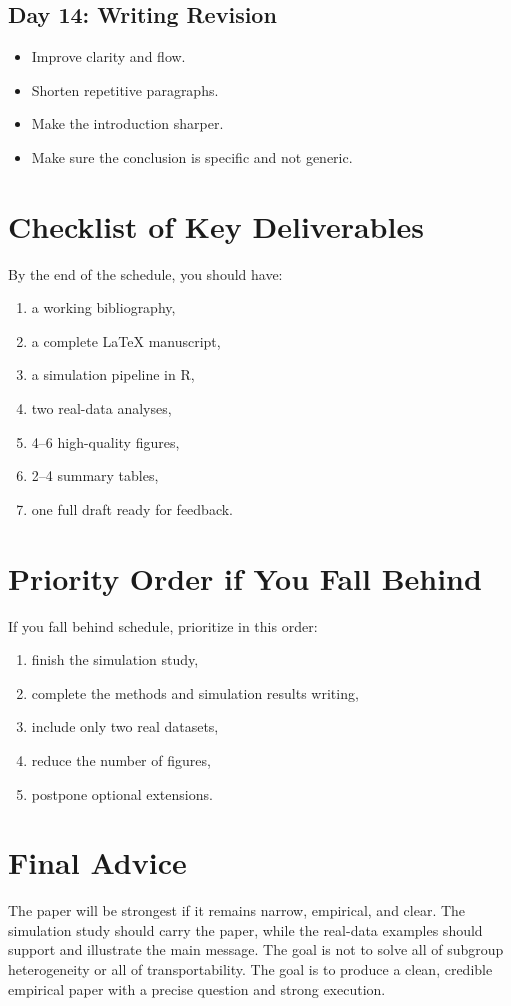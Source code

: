 \documentclass[11pt]{article}
\begin{document}
\subsection*{Day 14: Writing Revision}
\begin{itemize}
    \item Improve clarity and flow.
    \item Shorten repetitive paragraphs.
    \item Make the introduction sharper.
    \item Make sure the conclusion is specific and not generic.
\end{itemize}

\section{Checklist of Key Deliverables}
By the end of the schedule, you should have:
\begin{enumerate}[label=(\arabic*)]
    \item a working bibliography,
    \item a complete LaTeX manuscript,
    \item a simulation pipeline in R,
    \item two real-data analyses,
    \item 4--6 high-quality figures,
    \item 2--4 summary tables,
    \item one full draft ready for feedback.
\end{enumerate}

\section{Priority Order if You Fall Behind}
If you fall behind schedule, prioritize in this order:
\begin{enumerate}[label=(\arabic*)]
    \item finish the simulation study,
    \item complete the methods and simulation results writing,
    \item include only two real datasets,
    \item reduce the number of figures,
    \item postpone optional extensions.
\end{enumerate}

\section{Final Advice}
The paper will be strongest if it remains narrow, empirical, and clear. The simulation study should carry the paper, while the real-data examples should support and illustrate the main message. The goal is not to solve all of subgroup heterogeneity or all of transportability. The goal is to produce a clean, credible empirical paper with a precise question and strong execution.
\end{document}
